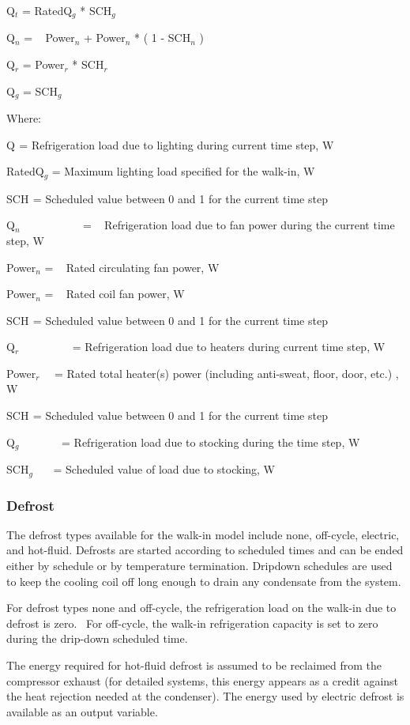 Q\(_{t}\) = RatedQ\(_{g}\) * SCH\(_{g}\)

Q\(_{n}\) = ~ Power\(_{n}\) + Power\(_{n}\) * ( 1 - SCH\(_{n}\) )

Q\(_{r}\) = Power\(_{r}\) * SCH\(_{r}\)

Q\(_{g}\) = SCH\(_{g}\)

Where:

Q\(_{ }\) = Refrigeration load due to lighting during current time step, W

RatedQ\(_{g}\) = Maximum lighting load specified for the walk-in, W

SCH\(_{ }\) = Scheduled value between 0 and 1 for the current time step

Q\(_{n}\) ~~~~~~~~~~ = ~ Refrigeration load due to fan power during the current time step, W

Power\(_{n}\) = ~ Rated circulating fan power, W

Power\(_{n}\) = ~ Rated coil fan power, W

SCH\(_{ }\) = Scheduled value between 0 and 1 for the current time step

Q\(_{r}\)~~~~~~~~~ = Refrigeration load due to heaters during current time step, W

Power\(_{r}\)~~ = Rated total heater(s) power (including anti-sweat, floor, door, etc.) , W

SCH\(_{ }\) = Scheduled value between 0 and 1 for the current time step

Q\(_{g}\)~~~~~~~ = Refrigeration load due to stocking during the time step, W

SCH\(_{g}\)~~~ = Scheduled value of load due to stocking, W

\subsubsection{Defrost}\label{defrost}

The defrost types available for the walk-in model include none, off-cycle, electric, and hot-fluid. Defrosts are started according to scheduled times and can be ended either by schedule or by temperature termination. Dripdown schedules are used to keep the cooling coil off long enough to drain any condensate from the system.

For defrost types none and off-cycle, the refrigeration load on the walk-in due to defrost is zero.~ For off-cycle, the walk-in refrigeration capacity is set to zero during the drip-down scheduled time.

The energy required for hot-fluid defrost is assumed to be reclaimed from the compressor exhaust (for detailed systems, this energy appears as a credit against the heat rejection needed at the condenser). The energy used by electric defrost is available as an output variable.

